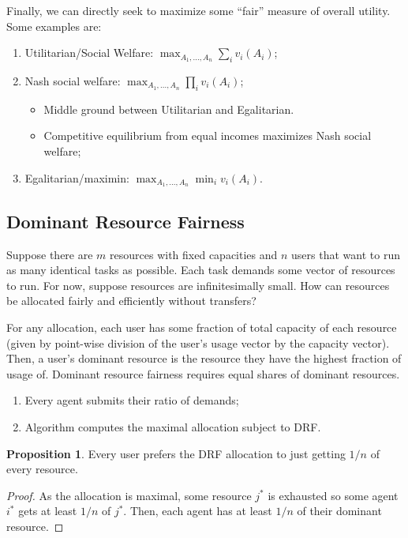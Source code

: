 \documentclass[dvipsnames]{article}
\theoremstyle{definition}
\newtheorem{proposition}[definition]{Proposition}
\theoremstyle{remark}
\newenvironment{mech}[1]{\begin{tcolorbox}[colback=red!5!white,colframe=red!75!black,title={#1}]}{\end{tcolorbox}}
\begin{document}
Finally, we can directly seek to maximize some ``fair'' measure of overall utility. Some examples are:
\begin{enumerate}
	\item Utilitarian/Social Welfare: $\max_{A_1,...,A_n} \sum_i v_i(A_i)$;
	\item Nash social welfare: $\max_{A_1,...,A_n} \prod_i v_i(A_i)$;
	\begin{itemize}
		\item Middle ground between Utilitarian and Egalitarian.
		\item Competitive equilibrium from equal incomes maximizes Nash social welfare;
	\end{itemize}
	\item Egalitarian/maximin: $\max_{A_1,...,A_n} \min_i v_i(A_i)$.
\end{enumerate}

\subsection{Dominant Resource Fairness}
Suppose there are $m$ resources with fixed capacities and $n$ users that want to run as many identical tasks as possible. Each task demands some vector of resources to run. For now, suppose resources are infinitesimally small. How can resources be allocated fairly and efficiently without transfers?

For any allocation, each user has some fraction of total capacity of each resource (given by point-wise division of the user's usage vector by the capacity vector). Then, a user's dominant resource is the resource they have the highest fraction of usage of. Dominant resource fairness requires equal shares of dominant resources.

\begin{mech}{Algorithm to get DRF Allocation}
	\begin{enumerate}
		\item Every agent submits their ratio of demands;
		\item Algorithm computes the maximal allocation subject to DRF.
	\end{enumerate}
\end{mech}

\begin{proposition}
	Every user prefers the DRF allocation to just getting $1/n$ of every resource. 
\end{proposition}

\begin{proof}
	As the allocation is maximal, some resource $j^*$ is exhausted so some agent $i^*$ gets at least $1/n$ of $j^*$. Then, each agent has at least $1/n$ of their dominant resource.
\end{proof}
\end{document}
